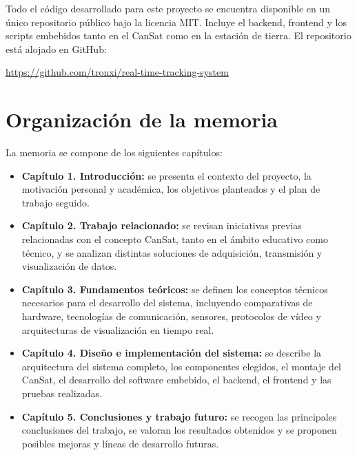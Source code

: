 Todo el código desarrollado para este proyecto se encuentra disponible en un único repositorio público bajo la licencia MIT.
%
Incluye el backend, frontend y los scripts embebidos tanto en el CanSat como en la estación de tierra.
%
El repositorio está alojado en GitHub:

\url{https://github.com/tronxi/real-time-tracking-system}


\section{Organización de la memoria}

La memoria se compone de los siguientes capítulos:

\begin{itemize}
    \item \textbf{Capítulo 1. Introducción:} se presenta el contexto del proyecto, la motivación personal y académica, los objetivos planteados y el plan de trabajo seguido.

    \item \textbf{Capítulo 2. Trabajo relacionado:} se revisan iniciativas previas relacionadas con el concepto CanSat, tanto en el ámbito educativo como técnico, y se analizan distintas soluciones de adquisición, transmisión y visualización de datos.

    \item \textbf{Capítulo 3. Fundamentos teóricos:} se definen los conceptos técnicos necesarios para el desarrollo del sistema, incluyendo comparativas de hardware, tecnologías de comunicación, sensores, protocolos de vídeo y arquitecturas de visualización en tiempo real.

    \item \textbf{Capítulo 4. Diseño e implementación del sistema:} se describe la arquitectura del sistema completo, los componentes elegidos, el montaje del CanSat, el desarrollo del software embebido, el backend, el frontend y las pruebas realizadas.

    \item \textbf{Capítulo 5. Conclusiones y trabajo futuro:} se recogen las principales conclusiones del trabajo, se valoran los resultados obtenidos y se proponen posibles mejoras y líneas de desarrollo futuras.
\end{itemize}